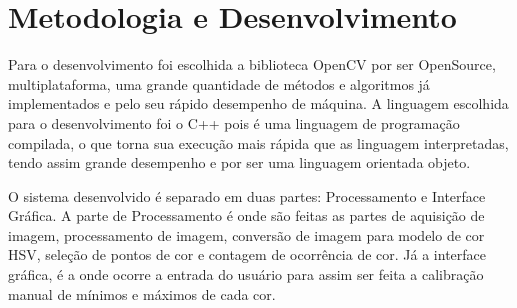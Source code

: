 	
	
	\chapter{Metodologia e Desenvolvimento} \label{Cap:Processamento}
	
			Para o desenvolvimento foi escolhida a biblioteca OpenCV por ser OpenSource, multiplataforma, uma grande quantidade de métodos e algoritmos já implementados	e pelo seu rápido desempenho de máquina.
			A linguagem escolhida para o desenvolvimento foi o C++ pois é uma linguagem de programação compilada, o que torna sua execução mais rápida que as linguagem interpretadas, tendo assim grande desempenho e por ser uma linguagem orientada objeto. 
			
			O sistema desenvolvido é separado em duas partes: Processamento e Interface Gráfica.
			A parte de Processamento é onde são feitas as partes de aquisição de imagem, processamento de imagem, conversão de imagem para modelo de cor HSV, seleção de pontos de cor e contagem de ocorrência de cor. Já a interface gráfica, é a onde ocorre a entrada do usuário para assim ser feita a calibração manual de mínimos e máximos de cada cor.
		
